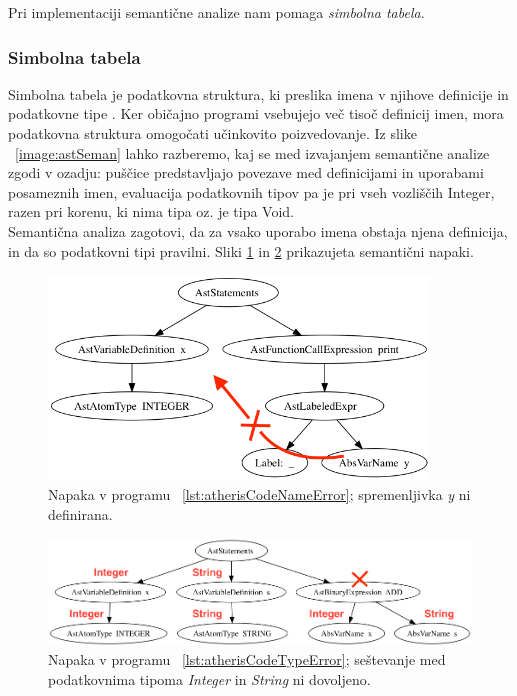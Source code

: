 \documentclass[a4paper, 12p]{book}
\begin{document}
Pri implementaciji semantične analize nam pomaga \textit{simbolna tabela}.

\subsubsection{Simbolna tabela}

Simbolna tabela je podatkovna struktura, ki preslika imena v njihove definicije in podatkovne tipe \cite{modernCompiler}. Ker običajno programi vsebujejo več tisoč definicij imen, mora podatkovna struktura omogočati učinkovito poizvedovanje. Iz slike ~\ref{image:astSeman} lahko razberemo, kaj se med izvajanjem semantične analize zgodi v ozadju: puščice predstavljajo povezave med definicijami in uporabami posameznih imen, evaluacija podatkovnih tipov pa je pri vseh vozliščih {\ttfamily Integer}, razen pri korenu, ki nima tipa oz. je tipa {\ttfamily Void}.\\
\indent Semantična analiza zagotovi, da za vsako uporabo imena obstaja njena definicija, in da so podatkovni tipi pravilni. Sliki \ref{image:astSemanCodeNameError} in \ref{image:astSemanTypeError} prikazujeta semantični napaki.

\begin{figure}[h]
	\begin{center}
		\includegraphics[width=0.9\textwidth]{resources/astSemanNameError.png}
	\end{center}
	\caption{Napaka v programu ~\ref{lst:atherisCodeNameError}; spremenljivka \textit{y} ni definirana.}
	\label{image:astSemanCodeNameError}
\end{figure}

\begin{figure}[h]
	\begin{center}
		\includegraphics[width=1\textwidth]{resources/astSemanTypeError.png}
	\end{center}
	\caption{Napaka v programu ~\ref{lst:atherisCodeTypeError}; seštevanje med podatkovnima tipoma \textit{Integer} in \textit{String} ni dovoljeno.}
	\label{image:astSemanTypeError}
\end{figure}
\end{document}
